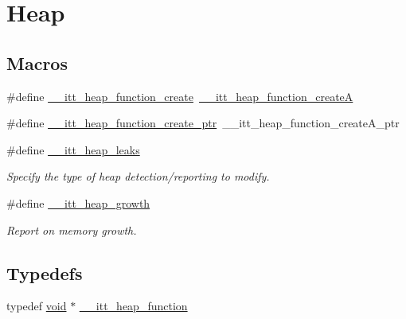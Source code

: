 \hypertarget{group__heap}{\section{Heap}
\label{group__heap}
}
\subsection*{Macros}
\begin{DoxyCompactItemize}
\item 
\#define \hyperlink{group__heap_gaee7be7751f527b329c003ab6b448c3b3}{\-\_\-\-\_\-itt\-\_\-heap\-\_\-function\-\_\-create}~\hyperlink{group__heap_gabbde8e9d232ceaf48c90adad4c1ce233}{\-\_\-\-\_\-itt\-\_\-heap\-\_\-function\-\_\-create\-A}
\item 
\#define \hyperlink{group__heap_gaa1e210ca1b3c31b5ee21996a2d9ed5d7}{\-\_\-\-\_\-itt\-\_\-heap\-\_\-function\-\_\-create\-\_\-ptr}~\-\_\-\-\_\-itt\-\_\-heap\-\_\-function\-\_\-create\-A\-\_\-ptr
\item 
\#define \hyperlink{group__heap_gaaa7b9ac40d4b4111561778090c52ec40}{\-\_\-\-\_\-itt\-\_\-heap\-\_\-leaks}
\begin{DoxyCompactList}\small\item\em Specify the type of heap detection/reporting to modify. \end{DoxyCompactList}\item 
\#define \hyperlink{group__heap_ga2cc49fdf479eba77b24b8ab3d507c5cd}{\-\_\-\-\_\-itt\-\_\-heap\-\_\-growth}
\begin{DoxyCompactList}\small\item\em Report on memory growth. \end{DoxyCompactList}\end{DoxyCompactItemize}
\subsection*{Typedefs}
\begin{DoxyCompactItemize}
\item 
typedef \hyperlink{ittnotify__static_8h_af941d56e55e3c5465135b60c4d6343ed}{void} $\ast$ \hyperlink{group__heap_ga3907115617c96d09c646554d1a386bdf}{\-\_\-\-\_\-itt\-\_\-heap\-\_\-function}
\end{DoxyCompactItemize}
